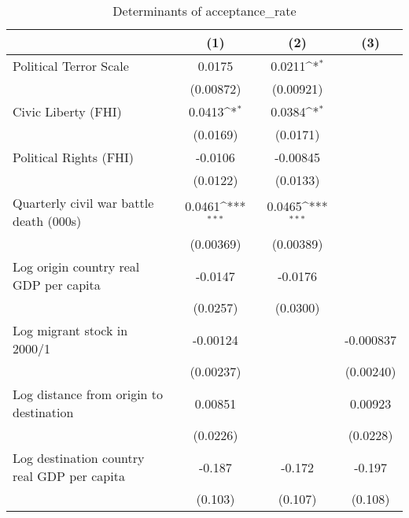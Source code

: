 \begin{table}[htbp]\centering
\def\sym#1{\ifmmode^{#1}\else\(^{#1}\)\fi}
\caption{Determinants of acceptance\_rate}
\begin{tabular}{l*{3}{c}}
\hline\hline
                    &\multicolumn{1}{c}{(1)}         &\multicolumn{1}{c}{(2)}         &\multicolumn{1}{c}{(3)}         \\
\hline
Political Terror Scale&      0.0175         &      0.0211\sym{*}  &                     \\
                    &   (0.00872)         &   (0.00921)         &                     \\
[1em]
Civic Liberty (FHI) &      0.0413\sym{*}  &      0.0384\sym{*}  &                     \\
                    &    (0.0169)         &    (0.0171)         &                     \\
[1em]
Political Rights (FHI)&     -0.0106         &    -0.00845         &                     \\
                    &    (0.0122)         &    (0.0133)         &                     \\
[1em]
Quarterly civil war battle death (000s)&      0.0461\sym{***}&      0.0465\sym{***}&                     \\
                    &   (0.00369)         &   (0.00389)         &                     \\
[1em]
Log origin country real GDP per capita&     -0.0147         &     -0.0176         &                     \\
                    &    (0.0257)         &    (0.0300)         &                     \\
[1em]
Log migrant stock in 2000/1&    -0.00124         &                     &   -0.000837         \\
                    &   (0.00237)         &                     &   (0.00240)         \\
[1em]
Log distance from origin to destination&     0.00851         &                     &     0.00923         \\
                    &    (0.0226)         &                     &    (0.0228)         \\
[1em]
Log destination country real GDP per capita&      -0.187         &      -0.172         &      -0.197         \\
                    &     (0.103)         &     (0.107)         &     (0.108)         \\

\end{tabular}
\end{table}
